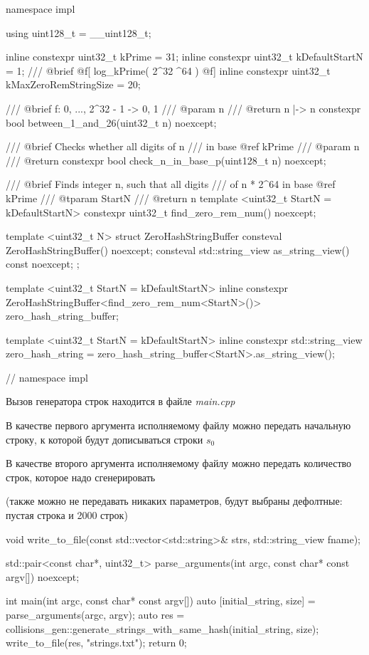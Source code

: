 \documentclass{report}
\begin{document}
\begin{cppcode}

namespace impl {

using uint128_t = __uint128_t;

inline constexpr uint32_t kPrime         = 31;
inline constexpr uint32_t kDefaultStartN = 1;
/// @brief @f[ \lceil log_{kPrime}( 2^{32} ^{64} ) \rceil @f]
inline constexpr uint32_t kMaxZeroRemStringSize = 20;

/// @brief f: { 0, ..., 2^32 - 1 } -> { 0, 1 }
/// @param n
/// @return n |-> n \in [1; 26]
constexpr bool between_1_and_26(uint32_t n) noexcept;

/// @brief Checks whether all digits of n
///        in base @ref kPrime \in [1; 26]
/// @param n
/// @return
constexpr bool check_n_in_base_p(uint128_t n) noexcept;

/// @brief Finds integer n, such that all digits
///        of n * 2^64 in base @ref kPrime \in [1; 26]
/// @tparam StartN
/// @return n
template <uint32_t StartN = kDefaultStartN>
constexpr uint32_t find_zero_rem_num() noexcept;

template <uint32_t N>
struct ZeroHashStringBuffer {
    consteval ZeroHashStringBuffer() noexcept;
    consteval std::string_view as_string_view() const noexcept;
};

template <uint32_t StartN = kDefaultStartN>
inline constexpr ZeroHashStringBuffer<find_zero_rem_num<StartN>()> zero_hash_string_buffer;

template <uint32_t StartN = kDefaultStartN>
inline constexpr std::string_view zero_hash_string 
    = zero_hash_string_buffer<StartN>.as_string_view();

}  // namespace impl

\end{cppcode}

Вызов генератора строк находится в файле \textit{main.cpp}

В качестве первого аргумента исполняемому файлу можно передать начальную строку, к которой будут дописываться строки $s_0$

В качестве второго аргумента исполняемому файлу можно передать количество строк, которое надо сгенерировать

(также можно не передавать никаких параметров, будут выбраны дефолтные: пустая строка и 2000 строк)

\begin{cppcode}

void write_to_file(const std::vector<std::string>& strs, std::string_view fname);

std::pair<const char*, uint32_t> parse_arguments(int argc, const char* const argv[]) noexcept;

int main(int argc, const char* const argv[]) {
    auto [initial_string, size] = parse_arguments(argc, argv);
    auto res = collisions_gen::generate_strings_with_same_hash(initial_string, size);
    write_to_file(res, "strings.txt");
    return 0;
}

\end{cppcode}
\end{document}
